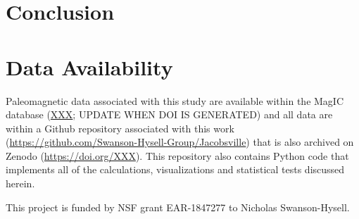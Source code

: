 \documentclass[draft]{agujournal2019}
\begin{document}
\section*{Conclusion}


\section*{Data Availability}
Paleomagnetic data associated with this study are available within the MagIC database (\url{XXX}; UPDATE WHEN DOI IS GENERATED) and all data are within a Github repository associated with this work (\url{https://github.com/Swanson-Hysell-Group/Jacobsville}) that is also archived on Zenodo (\url{https://doi.org/XXX}). This repository also contains Python code that implements all of the calculations, visualizations and statistical tests discussed herein. 

\acknowledgments
This project is funded by NSF grant EAR-1847277 to Nicholas Swanson-Hysell. 


\end{document}
